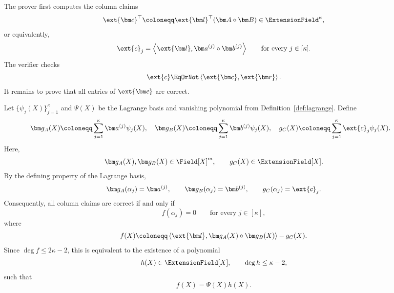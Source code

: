 The prover first computes the column claims
\[
    \ext{\bm c}^{\top}
    \coloneqq
    \ext{\bm l}^{\top}
    (\bm A\circ\bm B)
    \in\ExtensionField^\kappa,
\]
or equivalently,
\[
    \ext{c}_j
    =
    \left\langle
        \ext{\bm l},
        \bm a^{(j)}\circ\bm b^{(j)}
    \right\rangle
    \qquad
    \text{for every }j\in[\kappa].
\]
The verifier checks
\begin{equation*}
    \ext{c}
    \EqOrNot
    \left\langle
        \ext{\bm c},\ext{\bm r}
    \right\rangle.
\end{equation*}
It remains to prove that all entries of \(\ext{\bm c}\) are
correct.

Let \(\{\psi_j(X)\}_{j=1}^{\kappa}\) and \(\Psi(X)\) be the
Lagrange basis and vanishing polynomial from
Definition~\ref{def:lagrange}. Define
\[
\begin{aligned}
    \bm g_A(X)
    &\coloneqq
    \sum_{j=1}^{\kappa}
    \bm a^{(j)}\psi_j(X),
    \quad
    \bm g_B(X)
    \coloneqq
    \sum_{j=1}^{\kappa}
    \bm b^{(j)}\psi_j(X),
    \quad
    g_C(X)
    \coloneqq
    \sum_{j=1}^{\kappa}
    \ext{c}_j\psi_j(X).
\end{aligned}
\]
Here,
\[
    \bm g_A(X),\bm g_B(X)\in\Field[X]^m,
    \qquad
    g_C(X)\in\ExtensionField[X].
\]
By the defining property of the Lagrange basis,
\[
    \bm g_A(\alpha_j)=\bm a^{(j)},
    \qquad
    \bm g_B(\alpha_j)=\bm b^{(j)},
    \qquad
    g_C(\alpha_j)=\ext{c}_j.
\]
Consequently, all column claims are correct if and only if
\[
    f(\alpha_j)=0
    \qquad
    \text{for every }j\in[\kappa],
\]
where
\begin{equation*}
    f(X)
    \coloneqq
    \left\langle
        \ext{\bm l},
        \bm g_A(X)\circ\bm g_B(X)
    \right\rangle
    -
    g_C(X).
\end{equation*}
Since \(\deg f\leq 2\kappa-2\), this is equivalent to the
existence of a polynomial
\[
    h(X)\in\ExtensionField[X],
    \qquad
    \deg h\leq\kappa-2,
\]
such that
\begin{equation}
    f(X)=\Psi(X)h(X).
\label{eq:hadamard-quotient}
\end{equation}

